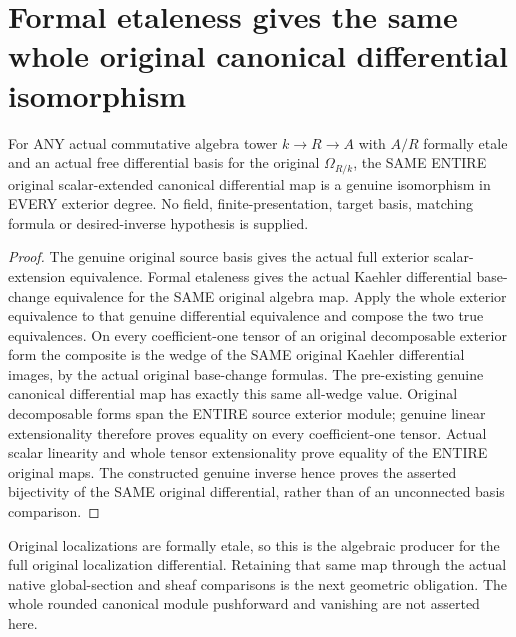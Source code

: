 \section{Formal etaleness gives the same whole original canonical differential isomorphism}
\label{sec:formally-etale-canonical-differential}

\begin{theorem}
\label{sc0-formally-etale-canonical:entire-map}
\leanok
For ANY actual commutative algebra tower $k\to R\to A$ with
$A/R$ formally etale and an actual free differential basis for the
original $\Omega_{R/k}$, the SAME ENTIRE original scalar-extended
canonical differential map is a genuine isomorphism in EVERY
exterior degree. No field, finite-presentation, target basis,
matching formula or desired-inverse hypothesis is supplied.
\end{theorem}
\begin{proof}
The genuine original source basis gives the actual full exterior
scalar-extension equivalence. Formal etaleness gives the actual
Kaehler differential base-change equivalence for the SAME original
algebra map. Apply the whole exterior equivalence to that genuine
differential equivalence and compose the two true equivalences.
On every coefficient-one tensor of an original decomposable
exterior form the composite is the wedge of the SAME original
Kaehler differential images, by the actual original base-change
formulas. The pre-existing genuine canonical differential map has
exactly this same all-wedge value. Original decomposable forms span
the ENTIRE source exterior module; genuine linear extensionality
therefore proves equality on every coefficient-one tensor. Actual
scalar linearity and whole tensor extensionality prove equality of
the ENTIRE original maps. The constructed genuine inverse hence
proves the asserted bijectivity of the SAME original differential,
rather than of an unconnected basis comparison.
\end{proof}

Original localizations are formally etale, so this is the algebraic
producer for the full original localization differential. Retaining
that same map through the actual native global-section and sheaf
comparisons is the next geometric obligation. The whole rounded
canonical module pushforward and vanishing are not asserted here.
